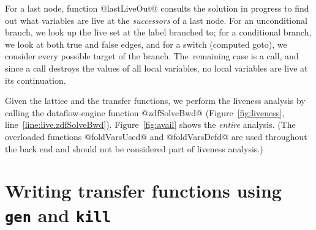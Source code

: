 \documentclass[blockstyle,preprint,nocopyrightspace]{sigplanconf}
\newcommand\lineref[1]{line~\ref{line:#1}}
\newcommand{\authornote}[1]{{\em #1}}
\def\authornote#1{\unskip\relax}
\newcommand{\norman}[1]{\authornote{NR: #1}}
\let\remark\norman
\newcommand\seclabel[1]{\label{sec:#1}}
\newcommand\figref[1]{Figure~\ref{fig:#1}}
\begin{document}
For a last node, function @lastLiveOut@ consults the solution in
progress to find out what variables are live at the \emph{successors} of a
last node. 
For an unconditional branch, we look up the live set at the label
branched to;\remark{line number}
for a conditional branch, we look at both true and false edges, \remark{linenumber}
 and
for a switch (computed goto), we consider every possible target of the
branch. \remark{line number}
The~remaining case \remark{line number} is a call, 
and since a call destroys the values of all local variables, no
local variables are live at its continuation.

Given the lattice and the transfer functions,
we perform the liveness analysis by calling
the dataflow-engine function @zdfSolveBwd@ (\figref{liveness},
\lineref{live.zdfSolveBwd}). 
\figref{avail} shows the \emph{entire} analysis.
(The overloaded functions
@foldVarsUsed@ and @foldVarsDefd@
are used throughout the back end and
should not be considered part of liveness analysis.)
%



\ifgenkill
\section{Writing transfer functions using {\mdseries\texttt{gen}} and
{\mdseries\texttt{kill}}}



\seclabel{gen-kill}
\end{document}
